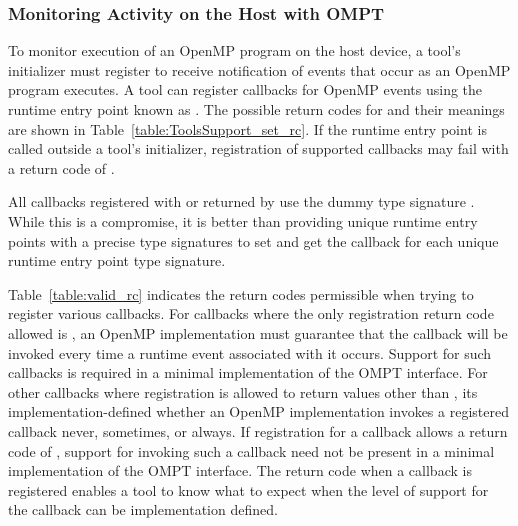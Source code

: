 \subsubsection{Monitoring Activity on the Host with OMPT}
\label{sec:ompt-register-callbacks}

To monitor execution of an OpenMP program on the host device, a tool's
initializer must register to receive notification
of events that occur as an OpenMP program executes.
A tool can register callbacks for OpenMP events using
the runtime entry point known as
.  The possible return codes for
 and their meanings are shown in
Table~\ref{table:ToolsSupport_set_rc}.
If the  runtime entry point is
called outside a tool's initializer, registration of supported
callbacks may fail with a return code of .

All callbacks registered with  or returned
by  use the dummy type signature
.  While this is a compromise, it is better
than providing unique runtime entry points with a precise type signatures to
set and get the callback for each unique runtime entry point type signature.

Table~\ref{table:valid_rc} indicates the return codes permissible
when trying to register various callbacks. For callbacks where the only registration return code
allowed is , an
OpenMP implementation must guarantee that the callback will be
invoked every time a runtime event associated with it occurs. Support
for such callbacks is required in a minimal implementation of the
OMPT interface. For other callbacks where registration is allowed to return values
other than , its implementation-defined
whether an OpenMP implementation invokes a registered callback
never, sometimes, or always. If registration for a callback allows
a return code of , support for invoking such
a callback need not be present in a minimal implementation of the
OMPT interface.  The return code when a callback is
registered enables a tool to know what to expect when the level
of support for the callback can be implementation defined.



